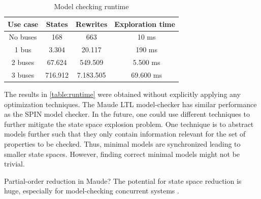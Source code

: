 \documentclass{jot}
\begin{document}
\begin{table}
\centering
\begin{tabular}{|c || c | c | c |}
 \hline
 Use case & States & Rewrites & Exploration time \\
 \hline\hline
 No buses & 168 & 663 & ~10 ms \\
 \hline
 1 bus & 3.304 & 20.117 & ~190 ms \\
 \hline
 2 buses & 67.624 & 549.509 & ~5.500 ms \\
 \hline
 3 buses & 716.912 & 7.183.505 & ~69.600 ms \\
 \hline
\end{tabular}
\caption{Model checking runtime}
\label{table:runtime}
\end{table}

The results in \autoref{table:runtime} were obtained without explicitly applying any optimization techniques.
The Maude LTL model-checker has similar performance as the SPIN model checker. %
In the future, one could use different techniques to further mitigate the state space explosion problem.
One technique is to abstract models further such that they only contain information relevant for the set of properties to be checked.
Thus, minimal models are synchronized leading to smaller state spaces.
However, finding correct minimal models might not be trivial.

Partial-order reduction in Maude? The potential for state space reduction is huge, especially for model-checking concurrent systems \cite{clarkeHandbookModelChecking2018}.


\end{document}
